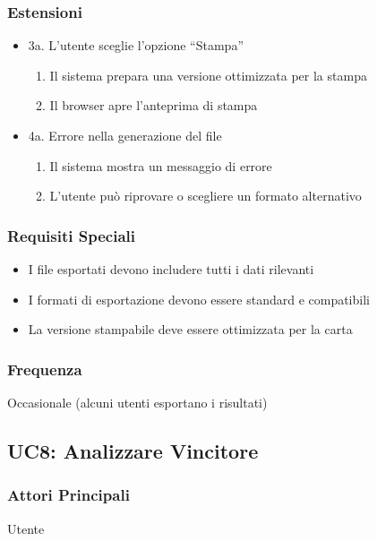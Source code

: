 \subsubsection{Estensioni}
\begin{itemize}
    \item 3a. L'utente sceglie l'opzione ``Stampa''
    \begin{enumerate}
        \item Il sistema prepara una versione ottimizzata per la stampa
        \item Il browser apre l'anteprima di stampa
    \end{enumerate}
    
    \item 4a. Errore nella generazione del file
    \begin{enumerate}
        \item Il sistema mostra un messaggio di errore
        \item L'utente può riprovare o scegliere un formato alternativo
    \end{enumerate}
\end{itemize}

\subsubsection{Requisiti Speciali}
\begin{itemize}
    \item I file esportati devono includere tutti i dati rilevanti
    \item I formati di esportazione devono essere standard e compatibili
    \item La versione stampabile deve essere ottimizzata per la carta
\end{itemize}

\subsubsection{Frequenza}
Occasionale (alcuni utenti esportano i risultati)

\subsection{UC8: Analizzare Vincitore}

\subsubsection{Attori Principali}
Utente

